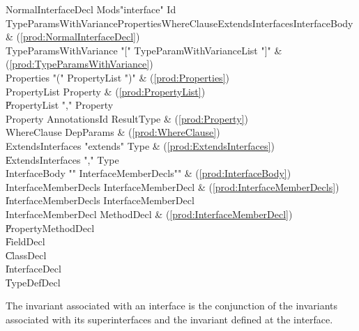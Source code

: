 \begin{bbgrammar}
 NormalInterfaceDecl    \: Mods\opt \xcd"interface" Id TypeParamsWithVariance\opt Properties\opt WhereClause\opt ExtendsInterfaces\opt InterfaceBody & (\ref{prod:NormalInterfaceDecl})\\%
 TypeParamsWithVariance    \: \xcd"[" TypeParamWithVarianceList \xcd"]" & (\ref{prod:TypeParamsWithVariance})\\%
 Properties    \: \xcd"(" PropertyList \xcd")" & (\ref{prod:Properties})\\%
 PropertyList    \: Property & (\ref{prod:PropertyList})\\%
    \| PropertyList \xcd"," Property\\
 Property    \: Annotations\opt Id ResultType & (\ref{prod:Property})\\%
 WhereClause    \: DepParams & (\ref{prod:WhereClause})\\%
 ExtendsInterfaces    \: \xcd"extends" Type & (\ref{prod:ExtendsInterfaces})\\%
    \| ExtendsInterfaces \xcd"," Type\\
 InterfaceBody    \: \xcd"{" InterfaceMemberDecls\opt \xcd"}" & (\ref{prod:InterfaceBody})\\%
 InterfaceMemberDecls    \: InterfaceMemberDecl & (\ref{prod:InterfaceMemberDecls})\\%
    \| InterfaceMemberDecls InterfaceMemberDecl\\
 InterfaceMemberDecl    \: MethodDecl & (\ref{prod:InterfaceMemberDecl})\\%
    \| PropertyMethodDecl\\
    \| FieldDecl\\
    \| ClassDecl\\
    \| InterfaceDecl\\
    \| TypeDefDecl\\


\end{bbgrammar}

\noindent
The invariant associated with an interface is the conjunction of the
invariants associated with its superinterfaces and the invariant
defined at the interface. 


